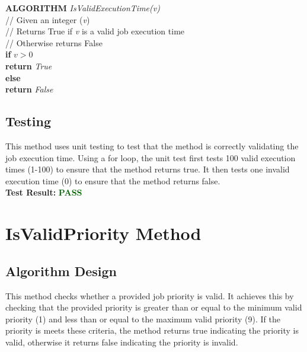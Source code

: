 \documentclass[12pt,a4paper]{article}
\begin{document}
			\textbf{ALGORITHM} \textit{IsValidExecutionTime(v)}\\
			\null\hspace{1cm}// Given an integer (\textit{v})\\
			\null\hspace{1cm}// Returns True if \textit{v} is a valid job execution time\\
			\null\hspace{1cm}// Otherwise returns False\\
			\null\hspace{1cm}\textbf{if} \textit{$v > 0$}\\
			\null\hspace{2cm}\textbf{return} \textit{True}\\
			\null\hspace{1cm}\textbf{else}\\
			\null\hspace{2cm}\textbf{return} \textit{False}

		\subsection{Testing}
			This method uses unit testing to test that the method is correctly validating the 
			job execution time. Using a for loop, the unit test first tests 100 valid execution times 
			(1-100) to ensure that the method returns true. It then tests one invalid execution time 
			(0) to ensure that the method returns false.\\

			\textbf{Test Result:} \textbf{\textcolor{darkgreen}{PASS}}\\

	\newpage

	\section{IsValidPriority Method}
		\subsection{Algorithm Design}
			This method checks whether a provided job priority is valid. It achieves this by 
			checking that the provided priority is greater than or equal to the minimum valid priority (1) and 
			less than or equal to the maximum valid priority (9). If the priority is meets these criteria, the 
			method returns true indicating the priority is valid, otherwise it returns false 
			indicating the priority is invalid.\\
\end{document}
